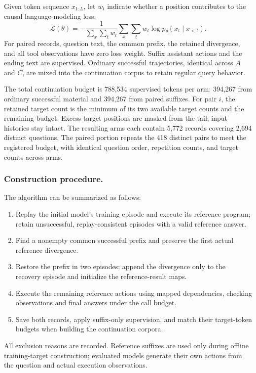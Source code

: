 Given token sequence $x_{1:L}$, let $w_t$ indicate whether a position contributes to the causal language-modeling loss:
\begin{equation}
 \mathcal{L}(\theta)=
 -\frac{1}{\sum_x\sum_t w_t}
 \sum_x\sum_t w_t\log p_\theta(x_t\mid x_{<t}).
\end{equation}
For paired records, question text, the common prefix, the retained divergence, and all tool observations have zero loss weight. Suffix assistant actions and the ending text are supervised. Ordinary successful trajectories, identical across $A$ and $C$, are mixed into the continuation corpus to retain regular query behavior.

The total continuation budget is 788,534 supervised tokens per arm: 394,267 from ordinary successful material and 394,267 from paired suffixes. For pair $i$, the retained target count is the minimum of its two available target counts and the remaining budget. Excess target positions are masked from the tail; input histories stay intact. The resulting arms each contain 5,772 records covering 2,694 distinct questions. The paired portion repeats the 418 distinct pairs to meet the registered budget, with identical question order, repetition counts, and target counts across arms.

\subsubsection{Construction procedure.}
The algorithm can be summarized as follows:
\begin{enumerate}
 \item Replay the initial model's training episode and execute its reference program; retain unsuccessful, replay-consistent episodes with a valid reference answer.
 \item Find a nonempty common successful prefix and preserve the first actual reference divergence.
 \item Restore the prefix in two episodes; append the divergence only to the recovery episode and initialize the reference-result maps.
 \item Execute the remaining reference actions using mapped dependencies, checking observations and final answers under the call budget.
 \item Save both records, apply suffix-only supervision, and match their target-token budgets when building the continuation corpora.
\end{enumerate}
All exclusion reasons are recorded. Reference suffixes are used only during offline training-target construction; evaluated models generate their own actions from the question and actual execution observations.

